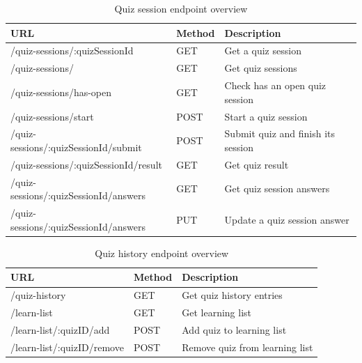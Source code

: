 \begin{table}[H]
    \begin{tabular}{|l|l|l|}
        \hline
        \textbf{URL} & \textbf{Method} & \textbf{Description} \\
        \hline
        /quiz-sessions/:quizSessionId & GET & Get a quiz session \\
        /quiz-sessions/ & GET & Get quiz sessions \\
        /quiz-sessions/has-open & GET & Check has an open quiz session \\
        /quiz-sessions/start & POST & Start a quiz session \\
        /quiz-sessions/:quizSessionId/submit & POST & Submit quiz and finish its session \\
        /quiz-sessions/:quizSessionId/result & GET & Get quiz result \\
        /quiz-sessions/:quizSessionId/answers & GET & Get quiz session answers \\
        /quiz-sessions/:quizSessionId/answers & PUT & Update a quiz session answer \\
        \hline
    \end{tabular}
    \caption{Quiz session endpoint overview}
    \label{tab:quiz-session-endpoints}
\end{table}

\begin{table}[H]
    \begin{tabular}{|l|l|l|}
        \hline
        \textbf{URL} & \textbf{Method} & \textbf{Description} \\
        \hline
        /quiz-history & GET & Get quiz history entries \\
        /learn-list & GET & Get learning list \\
        /learn-list/:quizID/add & POST & Add quiz to learning list \\
        /learn-list/:quizID/remove & POST & Remove quiz from learning list \\
        \hline
    \end{tabular}
    \caption{Quiz history endpoint overview}
    \label{tab:quiz-history-endpoints}
\end{table}

